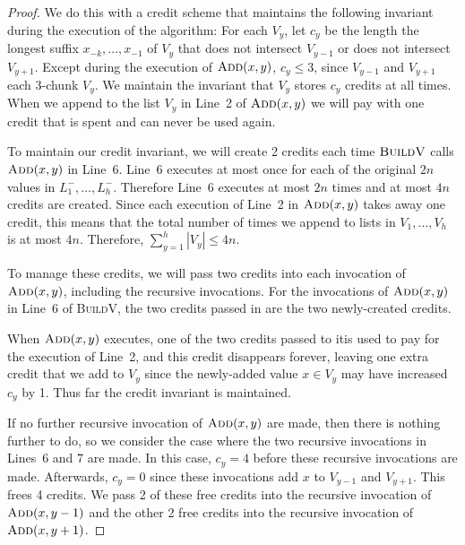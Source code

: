 \documentclass[kpfonts]{patmorin}
\begin{document}
\begin{proof}
  We do this with a credit scheme that maintains the following invariant  during the execution of the algorithm:  For each $V_y$, let $c_y$ be the length the longest suffix $x_{-k},\ldots,x_{-1}$ of $V_y$ that does not intersect $V_{y-1}$ or does not intersect $V_{y+1}$.  Except during the execution of $\textsc{Add}(x,y)$, $c_y\le 3$, since $V_{y-1}$ and $V_{y+1}$ each 3-chunk $V_y$.  We maintain the invariant that $V_{y}$ stores $c_y$ credits at all times.  When we append to the list $V_y$ in Line~2 of $\textsc{Add}(x,y)$ we will pay with one credit that is spent and can never be used again.
  
  To maintain our credit invariant, we will create 2 credits each time $\textsc{BuildV}$ calls $\textsc{Add}(x,y)$ in Line~6.  Line~6 executes at most once for each of the original $2n$ values in $L^-_1,\ldots,L^-_h$.  Therefore Line~6 executes at most $2n$ times and at most $4n$ credits are created.  Since each execution of Line~2 in $\textsc{Add}(x,y)$ takes away one credit, this means that the total number of times we append to lists in $V_1,\ldots,V_h$ is at most $4n$.
  Therefore, $\sum_{y=1}^h |V_y|\le 4n$.
   
  To manage these credits, we will pass two credits into each invocation of $\textsc{Add}(x,y)$, including the recursive invocations.  For the invocations of $\textsc{Add}(x,y)$ in Line~6 of \textsc{BuildV}, the two credits passed in are the two newly-created credits.
  
  When $\textsc{Add}(x,y)$ executes, one of the two credits passed to itis used to pay for the execution of Line~2, and this credit disappears forever, leaving one extra credit that we add to $V_y$ since the newly-added value $x\in V_y$ may have increased $c_y$ by 1. Thus far the credit invariant is maintained.  
  
  If no further recursive invocation of $\textsc{Add}(x,y)$ are made, then there is nothing further to do, so we consider the case where the two recursive invocations in Lines~6 and 7 are made.  In this case, $c_y=4$ before these recursive invocations are made.  Afterwards, $c_y=0$ since these invocations add $x$ to $V_{y-1}$ and $V_{y+1}$.  This frees 4 credits.  We pass 2 of these free credits into the recursive invocation of $\textsc{Add}(x,y-1)$ and the other 2 free credits into the recursive invocation of $\textsc{Add}(x,y+1)$. 
\end{proof}
 
% 
% 
% 
\end{document}
